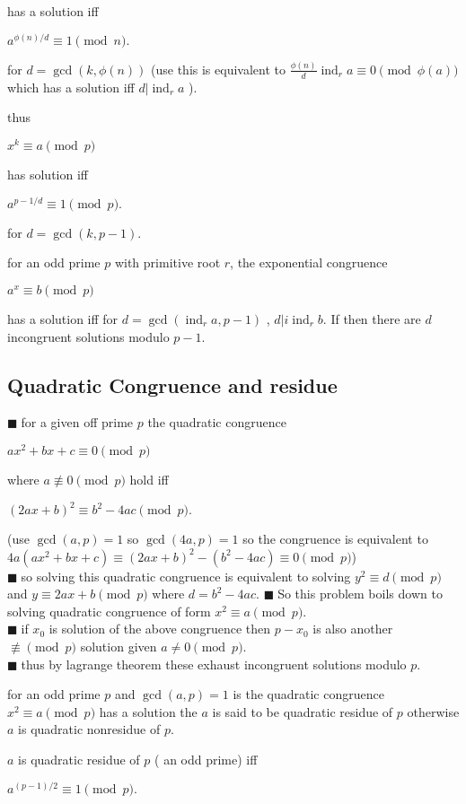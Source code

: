 \documentclass[11pt]{extarticle}
\newcommand{\snote}[1]{{\footnotesize(#1)}}
\newcommand{\tbx}[2][]{
\begin{tcolorbox}[enhanced,breakable,size=small,colback=black!2!white,title={#1},arc is angular, arc=1.5mm,
	drop fuzzy shadow]
	#2
\end{tcolorbox}
}
\newcommand{\y}{$\blacksquare\;$}
\DeclareMathOperator{\ix}{ind}
\begin{document}
\begin{multicols}{2}
{{	has a solution iff 
\begin{center}
 $ a^{\phi(n)/d}\equiv 1\pmod{n}. $ 
 \end{center}
} for $ d=\gcd(k,\phi(n)) $ \snote{use this is equivalent to $ \frac{ \phi(n) }{d} \ix_ra\equiv 0\pmod{\phi(a)} $ which has a solution iff $ d|\ix_ra $ }.
\tbx{ thus 
\begin{center}
 $ x^k\equiv a\pmod{p} $ 
 \end{center}
 
	has solution iff 
\begin{center}
 $ a^{p-1/d} \equiv 1\pmod{p}. $ 
 \end{center}
 for $ d=\gcd(k,p-1) .$ }}
\tbx[Exponential Congruence]{  for an odd prime $ p $ with primitive root $ r $, the exponential congruence 
\begin{center}
 $  a^x\equiv b\pmod{p} $ 
 \end{center}
 has a solution iff for $ d=\gcd(\ix_ra,p-1) $ , $ d|i\ix_rb. $ If then there are $ d $ incongruent solutions modulo $ p-1. $}
\newcolumn
\subsection{Quadratic Congruence and residue}
 
\tbx[main problem]{ 
\y for a given off prime $ p $ the quadratic congruence 

\begin{center}
 $ ax^2+bx+c\equiv 0\pmod{p} $ 
 \end{center}
 where $ a\not\equiv 0\pmod{p} $ 
hold iff 
\begin{center}
 $ (2ax+b)^2\equiv b^2-4ac\pmod p. $ 
 \end{center}

\snote{use $ \gcd(a,p)=1 $ so $ \gcd(4a,p)=1 $ so the congruence is equivalent to $ 4a(ax^2+bx+c)\equiv(2ax+b)^2-(b^2-4ac)\equiv 0\pmod{p} $} \\
\y so solving this quadratic congruence is equivalent to solving  
$ y^2\equiv d\pmod{p}$ and $
y\equiv2ax+b\pmod{p} $
where $ d=b^2-4ac. $
\y So this problem boils down to solving quadratic congruence of form $ x^2\equiv a\pmod{p}. $\\
\y if $ x_0 $ is solution of the above congruence then $ p-x_0 $  is also another $ \not\equiv\pmod{p} $  solution given $ a\neq 0\pmod{p}.$\\
\y thus by lagrange theorem these exhaust incongruent solutions modulo $ p. $}

\tbx[Quadratic residue]{  for an odd prime $ p $  and $ \gcd(a,p)=1 $  is the quadratic congruence $ x^2\equiv a\pmod{p} $ has a solution the $ a $ is said to be quadratic residue of $ p $ otherwise $ a $ is quadratic nonresidue of $ p $. }
\tbx[Euler's criterion]{  $ a $ is quadratic residue of $ p $ \snote{ an odd prime} iff  
\begin{center}
 $ a^{(p-1)/2}\equiv 1 \pmod{p}. $ 
 \end{center}

}
\end{multicols}
\end{document}
